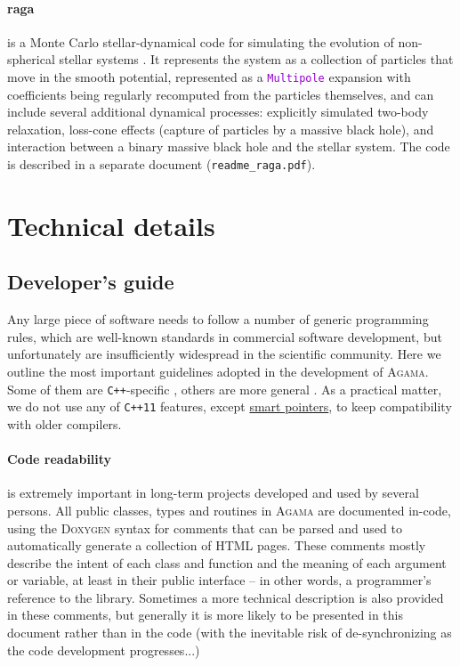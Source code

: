 \documentclass[12pt]{article}
\newcommand{\Agama}{\textsc{Agama}\xspace}
\newcommand{\Cpp}  {\texttt{C++}\xspace}
\newcommand{\CppII}{\texttt{C++11}\xspace}
\newcommand{\ttt}[1]{\textcolor{darkviolet}{\texttt{#1}}}
\begin{document}
\paragraph{raga} is a Monte Carlo stellar-dynamical code for simulating the evolution of non-spherical stellar systems \cite{Vasiliev2015}. It represents the system as a collection of particles that move in the smooth potential, represented as a \ttt{Multipole} expansion with coefficients being regularly recomputed from the particles themselves, and can include several additional dynamical processes: explicitly simulated two-body relaxation, loss-cone effects (capture of particles by a massive black hole), and interaction between a binary massive black hole and the stellar system. The code is described in a separate document (\texttt{readme_raga.pdf}).

\newpage
\appendix

\section{Technical details}

\subsection{Developer's guide}  \label{sec:DeveloperGuide}

Any large piece of software needs to follow a number of generic programming rules, which are well-known standards in commercial software development, but unfortunately are insufficiently widespread in the scientific community. Here we outline the most important guidelines adopted in the development of \Agama. Some of them are \Cpp-specific \cite{Meyers,SutterAlexandrescu}, others are more general \cite{Martin,McConnell}.
As a practical matter, we do not use any of \CppII features, except \hyperref[sec:SmartPointers]{smart pointers}, to keep compatibility with older compilers.

\paragraph{Code readability} is extremely important in long-term projects developed and used by several persons. All public classes, types and routines in \Agama are documented in-code, using the \textsc{Doxygen} syntax for comments that can be parsed and used to automatically generate a collection of HTML pages. These comments mostly describe the intent of each class and function and the meaning of each argument or variable, at least in their public interface -- in other words, a programmer's reference to the library. Sometimes a more technical description is also provided in these comments, but generally it is more likely to be presented in this document rather than in the code (with the inevitable risk of de-synchronizing as the code development progresses...)
\end{document}
